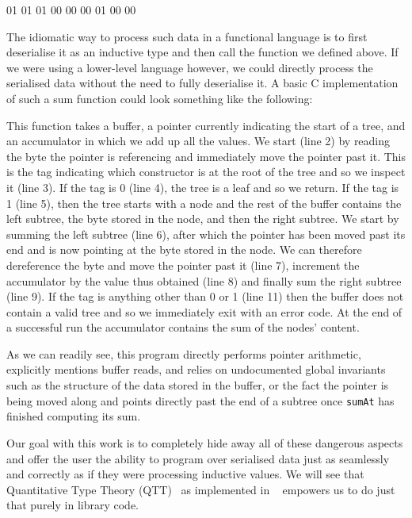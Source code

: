 \begin{hexdump}
01 01 01 00  00  00  01 00  00
\end{hexdump}

The idiomatic way to process such data in a functional language
is to first deserialise it as an inductive type and then call
the  function we defined above.
%
If we were using a lower-level language however, we could directly
process the serialised data without the need to fully deserialise it.
%
A basic C implementation of such a sum function could look something
like the following:



This function takes a buffer, a pointer currently indicating the start of
a tree, and an accumulator in which we add up all the values.
%
We start (line 2) by reading the byte the pointer is referencing and
immediately move the pointer past it.
%
This is the tag indicating which constructor is at the root of the tree
and so we inspect it (line 3).
%
If the tag is 0 (line 4), the tree is a leaf and so we return.
%
If the tag is 1 (line 5), then the tree starts with a node and the rest
of the buffer contains the left subtree, the byte stored in the node,
and then the right subtree.
%
We start by summing the left subtree (line 6),
after which the pointer has been moved past its end and is now pointing
at the byte stored in the node.
We can therefore dereference the byte and move the pointer past it (line 7),
increment the accumulator by the value thus obtained (line 8)
and finally sum the right subtree (line 9).
%
If the tag is anything other than 0 or 1 (line 11) then the buffer does not
contain a valid tree and so we immediately exit with an error code.
%
At the end of a successful run the accumulator contains the sum of the nodes' content.


As we can readily see, this program
directly performs pointer arithmetic,
explicitly mentions buffer reads,
and relies on undocumented global invariants
such as the structure of the data stored in the buffer,
or the fact the pointer is being moved along and points directly past
the end of a subtree once \texttt{sumAt} has finished computing
its sum.

Our goal with this work is to completely hide away all of these
dangerous aspects
and offer the user the ability to program over serialised data
just as seamlessly and correctly as
if they were processing inductive values.
%
We will see that
Quantitative Type Theory (QTT)~\cite{DBLP:conf/birthday/McBride16, DBLP:conf/lics/Atkey18}
as implemented in \idris{}~\cite{DBLP:conf/ecoop/Brady21}
empowers us to do just that purely in library code.

